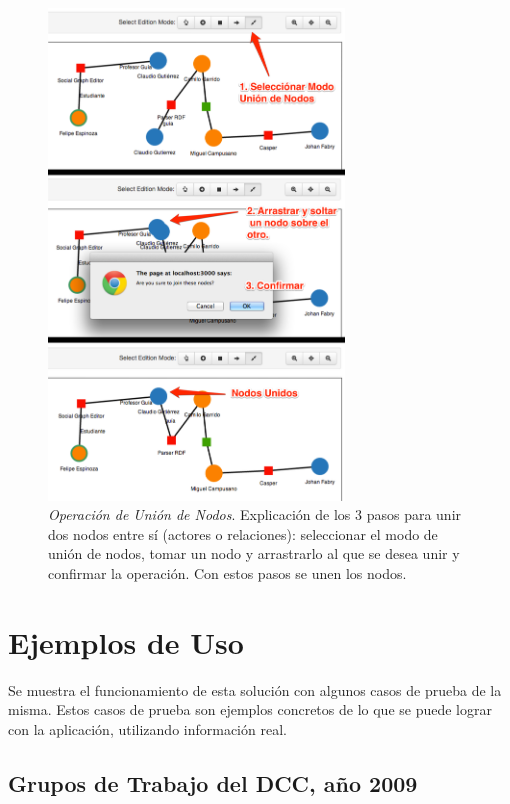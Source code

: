 \begin{figure}[H]
  \centering
  \includegraphics[width=0.7\textwidth]{images/node_join.png}
  \caption[Operación de Unión de Nodos]{\emph{Operación de Unión de Nodos}. Explicación de los 3 pasos para unir dos nodos entre sí (actores o relaciones): seleccionar el modo de unión de nodos, tomar un nodo y arrastrarlo al que se desea unir y confirmar la operación. Con estos pasos se unen los nodos.}
  \label{node_join}
\end{figure}


\section{Ejemplos de Uso} %
\label{sec:ejemplos_de_uso}

Se muestra el funcionamiento de esta solución con algunos casos de prueba de la misma. Estos casos de prueba son ejemplos concretos de lo que se puede lograr con la aplicación, utilizando información real.

\subsection{Grupos de Trabajo del DCC, año 2009} %
\label{sub:grupos_de_trabajo_del_dcc_2009}


